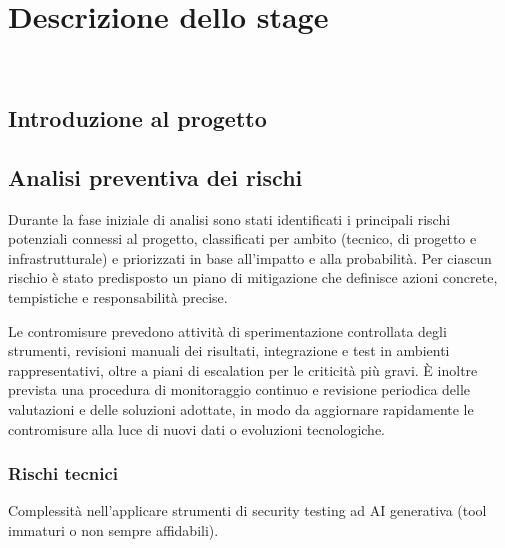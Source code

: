 \chapter{Descrizione dello stage}
\label{cap:descrizione-stage}
\\

\section{Introduzione al progetto}


\section{Analisi preventiva dei rischi}

Durante la fase iniziale di analisi sono stati identificati i principali rischi potenziali connessi al progetto, classificati per ambito (tecnico, di progetto e infrastrutturale) e priorizzati in base all'impatto e alla probabilità. Per ciascun rischio è stato predisposto un piano di mitigazione che definisce azioni concrete, tempistiche e responsabilità precise.

Le contromisure prevedono attività di sperimentazione controllata degli strumenti, revisioni manuali dei risultati, integrazione e test in ambienti rappresentativi, oltre a piani di escalation per le criticità più gravi. È inoltre prevista una procedura di monitoraggio continuo e revisione periodica delle valutazioni e delle soluzioni adottate, in modo da aggiornare rapidamente le contromisure alla luce di nuovi dati o evoluzioni tecnologiche.

\subsection{Rischi tecnici}

\begin{risk}{Complessità nell'applicare strumenti di security testing ad AI generativa (tool immaturi o
non sempre affidabili).}
\end{risk}

